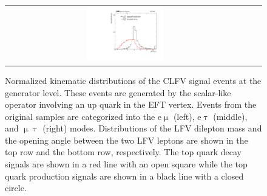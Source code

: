 \begin{figure}[tbh!]
\begin{center}
\begin{tabular}{ccc}
 \includegraphics[width=0.33\textwidth]{figures/Part4/Signal/llDr_mutau}\\
 \end{tabular}
 \caption{Normalized kinematic distributions of the \ac{CLFV} signal events at the generator level. These events are generated by the scalar-like operator involving an up quark in the \ac{EFT} vertex. Events from the original samples are categorized into the e$\upmu$ (left), e$\uptau$ (middle), and $\upmu\uptau$ (right) modes. Distributions of the LFV dilepton mass and the opening angle between the two LFV leptons are shown in the top row and the bottom row, respectively. The top quark decay signals are shown in a red line with an open square while the top quark production signals are shown in a black line with a closed circle.}
 \label{fig:SigGen}
 \end{center}
 \end{figure}